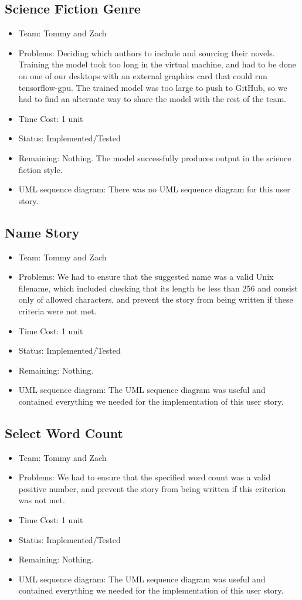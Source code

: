 \documentclass[12pt]{article}
\begin{document}
\subsection{Science Fiction Genre}
\begin{itemize}
\item Team: Tommy and Zach
\item Problems: Deciding which authors to include and sourcing their novels. Training the model took too long in the virtual machine, and had to be done on one of our desktops with an external graphics card that could run tensorflow-gpu. The trained model was too large to push to GitHub, so we had to find an alternate way to share the model with the rest of the team.
\item Time Cost: 1 unit 
\item Status: Implemented/Tested
\item Remaining: Nothing. The model successfully produces output in the science fiction style.
\item UML sequence diagram: There was no UML sequence diagram for this user story.
\end{itemize}

\subsection{Name Story}
\begin{itemize}
\item Team: Tommy and Zach
\item Problems: We had to ensure that the suggested name was a valid Unix filename, which included checking that its length be less than 256 and consist only of allowed characters, and prevent the story from being written if these criteria were not met.
\item Time Cost:  1 unit
\item Status: Implemented/Tested
\item Remaining: Nothing.
\item UML sequence diagram: The UML sequence diagram was useful and contained everything we needed for the implementation of this user story.
\end{itemize}

\subsection{Select Word Count}
\begin{itemize}
\item Team: Tommy and Zach
\item Problems: We had to ensure that the specified word count was a valid positive number, and prevent the story from being written if this criterion was not met.
\item Time Cost: 1 unit 
\item Status: Implemented/Tested
\item Remaining: Nothing.
\item UML sequence diagram: The  UML sequence diagram was useful and contained everything we needed for the implementation of this user story.
\end{itemize}
\end{document}

